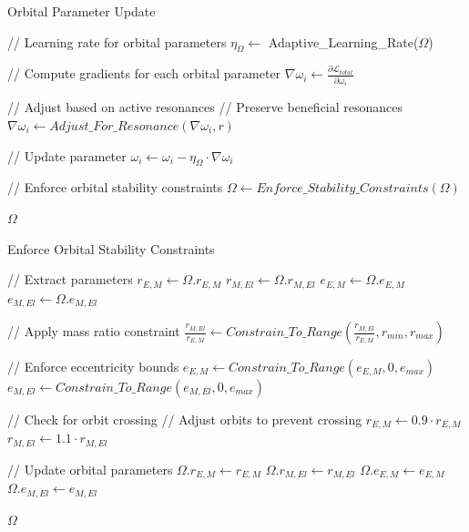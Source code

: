 \begin{algorithm}
\caption{Orbital Parameter Update}
\begin{algorithmic}[1]
    \State // Learning rate for orbital parameters
    \State $\eta_{\Omega} \gets $ Adaptive\_Learning\_Rate($\Omega$)
    
    \State // Compute gradients for each orbital parameter
        \State $\nabla \omega_i \gets \frac{\partial \mathcal{L}_{total}}{\partial \omega_i}$
        
        \State // Adjust based on active resonances
                \State // Preserve beneficial resonances
                \State $\nabla \omega_i \gets Adjust\_For\_Resonance(\nabla \omega_i, r)$
            \EndIf
        \EndFor
        
        \State // Update parameter
        \State $\omega_i \gets \omega_i - \eta_{\Omega} \cdot \nabla \omega_i$
    \EndFor
    
    \State // Enforce orbital stability constraints
    \State $\Omega \gets Enforce\_Stability\_Constraints(\Omega)$
    
    \State \Return $\Omega$
\EndFunction
\end{algorithmic}
\end{algorithm}

\begin{algorithm}
\caption{Enforce Orbital Stability Constraints}
\begin{algorithmic}[1]
    \State // Extract parameters
    \State $r_{E,M} \gets \Omega.r_{E,M}$ 
    \State $r_{M,El} \gets \Omega.r_{M,El}$ 
    \State $e_{E,M} \gets \Omega.e_{E,M}$ 
    \State $e_{M,El} \gets \Omega.e_{M,El}$ 
    
    \State // Apply mass ratio constraint
    \State $\frac{r_{M,El}}{r_{E,M}} \gets Constrain\_To\_Range(\frac{r_{M,El}}{r_{E,M}}, r_{min}, r_{max})$
    
    \State // Enforce eccentricity bounds
    \State $e_{E,M} \gets Constrain\_To\_Range(e_{E,M}, 0, e_{max})$
    \State $e_{M,El} \gets Constrain\_To\_Range(e_{M,El}, 0, e_{max})$
    
    \State // Check for orbit crossing
        \State // Adjust orbits to prevent crossing
        \State $r_{E,M} \gets 0.9 \cdot r_{E,M}$
        \State $r_{M,El} \gets 1.1 \cdot r_{M,El}$
    \EndIf
    
    \State // Update orbital parameters
    \State $\Omega.r_{E,M} \gets r_{E,M}$
    \State $\Omega.r_{M,El} \gets r_{M,El}$
    \State $\Omega.e_{E,M} \gets e_{E,M}$
    \State $\Omega.e_{M,El} \gets e_{M,El}$
    
    \State \Return $\Omega$
\EndFunction
\end{algorithmic}
\end{algorithm}

